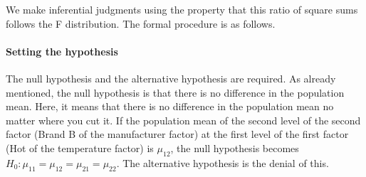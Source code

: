 \documentclass{ltjbook}
\begin{document}





We make inferential judgments using the property that this ratio of square sums follows the F distribution.
The formal procedure is as follows.
\paragraph{Setting the hypothesis} The null hypothesis and the alternative hypothesis are required. As already mentioned, the null hypothesis is that there is no difference in the population mean. Here, it means that there is no difference in the population mean no matter where you cut it. If the population mean of the second level of the second factor (Brand B of the manufacturer factor) at the first level of the first factor (Hot of the temperature factor) is $\mu_{12}$, the null hypothesis becomes $H_0:\mu_{11}=\mu_{12}=\mu_{21}=\mu_{22}$. The alternative hypothesis is the denial of this.
\end{document}
